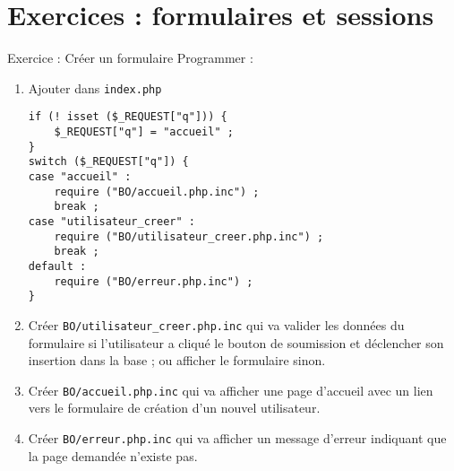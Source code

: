 
\section{Exercices : formulaires et sessions}

\begin{frame}[containsverbatim]{Exercice  : Créer un formulaire}
	Programmer :
	\begin{enumerate}
		\item Ajouter dans \texttt{index.php}
		\begin{block}{}
			\begin{lstlisting}
if (! isset ($_REQUEST["q"])) {
	$_REQUEST["q"] = "accueil" ;
}
switch ($_REQUEST["q"]) {
case "accueil" :
	require ("BO/accueil.php.inc") ;
	break ;
case "utilisateur_creer" :
	require ("BO/utilisateur_creer.php.inc") ;
	break ;
default :
	require ("BO/erreur.php.inc") ;
}
			\end{lstlisting}
		\end{block}
		\item Créer \texttt{BO/utilisateur\_creer.php.inc} qui va valider les données du formulaire si l’utilisateur a cliqué le bouton de soumission et déclencher son insertion dans la base ; ou afficher le formulaire sinon.
		\item Créer \texttt{BO/accueil.php.inc} qui va afficher une page d’accueil avec un lien vers le formulaire de création d’un nouvel utilisateur.
		\item Créer \texttt{BO/erreur.php.inc} qui va afficher un message d’erreur indiquant que la page demandée n’existe pas.
	\end{enumerate}
\end{frame}
